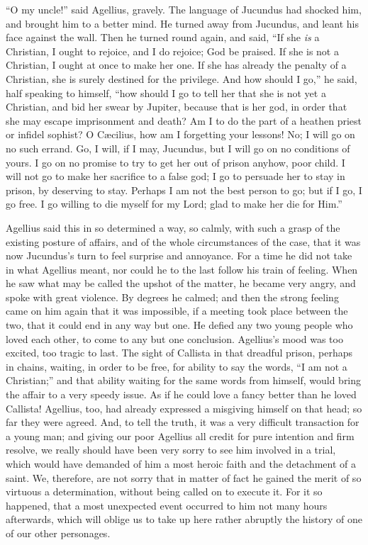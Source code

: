 ``O my uncle!'' said Agellius, gravely. The language of
Jucundus had shocked him, and brought him to a better mind. He turned
away from Jucundus, and leant his face against the wall. Then he
turned round again, and said, ``If she \emph{is} a Christian, I
ought to rejoice, and I do rejoice; God be praised. If she is not a
Christian, I ought at once to make her one. If she has already
the penalty of a Christian, she is surely destined for the privilege.
And how should I go,'' he said, half speaking to himself,
``how should I go to tell her that she is not yet a Christian, and
bid her swear by Jupiter, because that is her god, in order that she
may escape imprisonment and death? Am I to do the part of a heathen
priest or infidel sophist? O Cæcilius, how am I forgetting your
lessons! No; I will go on no such errand. Go, I will, if I may,
Jucundus, but I will go on no conditions of yours. I go on no promise
to try to get her out of prison anyhow, poor child. I will not go to
make her sacrifice to a false god; I go to persuade her to stay in
prison, by deserving to stay. Perhaps I am not the best person to go;
but if I go, I go free. I go willing to die myself for my Lord; glad
to make her die for Him.''

Agellius said this in so determined a way, so calmly, with such a
grasp of the existing posture of affairs, and of the whole
circumstances of the case, that it was now Jucundus's turn to feel
surprise and annoyance. For a time he did not take in what Agellius
meant, nor could he to the last follow his train of feeling. When he
saw what may be called the upshot of the matter, he became very angry,
and spoke with great violence. By degrees he calmed; and then the
strong feeling came on him again that it was impossible, if a meeting
took place between the two, that it could end in any way but one. He
defied any two young people who loved each other, to come to any
but one conclusion. Agellius's mood was too excited, too tragic to
last. The sight of Callista in that dreadful prison, perhaps in
chains, waiting, in order to be free, for ability to say the words,
``I am not a Christian;'' and that ability waiting for the
same words from himself, would bring the affair to a very speedy
issue. As if he could love a fancy better than he loved Callista!
Agellius, too, had already expressed a misgiving himself on that head;
so far they were agreed. And, to tell the truth, it was a very
difficult transaction for a young man; and giving our poor Agellius
all credit for pure intention and firm resolve, we really should have
been very sorry to see him involved in a trial, which would have
demanded of him a most heroic faith and the detachment of a saint. We,
therefore, are not sorry that in matter of fact he gained the merit of
so virtuous a determination, without being called on to execute it.
For it so happened, that a most unexpected event occurred to him not
many hours afterwards, which will oblige us to take up here rather
abruptly the history of one of our other personages.

